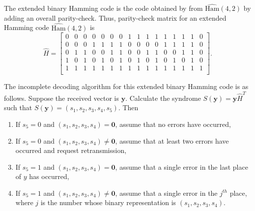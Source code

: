 The extended binary Hamming code is the code obtained by from $\hat{\textrm{Ham}}(4,2)$  by adding an overall parity-check. Thus, parity-check matrix for an extended Hamming code $\hat{\textrm{Ham}}(4,2)$ is 
\begin{equation*}
\hat{H} = 
\begin{bmatrix}
0 & 0 & 0 & 0 & 0 & 0 & 0 & 1 & 1 & 1 & 1 & 1 & 1 & 1 & 1 & 0 \\ 
0 & 0 & 0 & 1 & 1 & 1 & 1 & 0 & 0 & 0 & 0 & 1 & 1 & 1 & 1 & 0 \\ 
0 & 1 & 1 & 0 & 0 & 1 & 1 & 0 & 0 & 1 & 1 & 0 & 0 & 1 & 1 & 0 \\ 
1 & 0 & 1 & 0 & 1 & 0 & 1 & 0 & 1 & 0 & 1 & 0 & 1 & 0 & 1 & 0 \\
1 & 1 & 1 & 1 & 1 & 1 & 1 & 1 & 1 & 1 & 1 & 1 & 1 & 1 & 1 & 1 \\
\end{bmatrix}.
\end{equation*}

The incomplete decoding algorithm for this extended binary Hamming code is as follows. Suppose the received vector is $\bm{y}$.  Calculate the syndrome $S(\bm{y}) = \bm{y}\hat{H}^T$ such that $S(\bm{y}) = (s_1, s_2, s_3, s_4, s_5)$. Then
\begin{enumerate}
\item
	If $s_5 = 0$ and $(s_1, s_2, s_3, s_4) = \bm{0}$, assume that no errors have occurred,
\item
	If $s_5 = 0$ and $(s_1, s_2, s_3, s_4) \not= \bm{0}$, assume that at least two errors have occurred and request retransmission,
\item
	If $s_5 = 1$ and $(s_1, s_2, s_3, s_4) = \bm{0}$, assume that a single error in the last place of $y$ has occurred,
\item
	If $s_5 = 1$ and $(s_1, s_2, s_3, s_4) \not= \bm{0}$, assume that a single error in the $j^{th}$ place, where $j$ is the number whose binary representation is $(s_1, s_2, s_3, s_4)$.
\end{enumerate}

